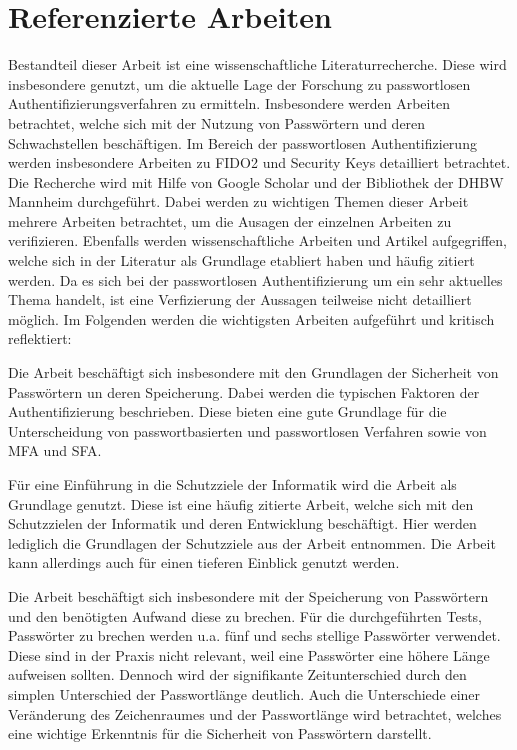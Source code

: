 \section{Referenzierte Arbeiten}

Bestandteil dieser Arbeit ist eine wissenschaftliche Literaturrecherche. Diese wird insbesondere genutzt, um die aktuelle Lage der Forschung zu passwortlosen Authentifizierungsverfahren zu ermitteln. Insbesondere werden Arbeiten betrachtet, welche sich mit der Nutzung von Passwörtern und deren Schwachstellen beschäftigen. Im Bereich der passwortlosen Authentifizierung werden insbesondere Arbeiten zu \ac{FIDO}2 und Security Keys detailliert betrachtet. Die Recherche wird mit Hilfe von Google Scholar und der Bibliothek der DHBW Mannheim durchgeführt. Dabei werden zu wichtigen Themen dieser Arbeit mehrere Arbeiten betrachtet, um die Ausagen der einzelnen Arbeiten zu verifizieren. Ebenfalls werden wissenschaftliche Arbeiten und Artikel aufgegriffen, welche sich in der Literatur als Grundlage etabliert haben und häufig zitiert werden. Da es sich bei der passwortlosen Authentifizierung um ein sehr aktuelles Thema handelt, ist eine Verfizierung der Aussagen teilweise nicht detailliert möglich. Im Folgenden werden die wichtigsten Arbeiten aufgeführt und kritisch reflektiert:

Die Arbeit \cite{boonkrong2012security} beschäftigt sich insbesondere mit den Grundlagen der Sicherheit von Passwörtern un deren Speicherung. Dabei werden die typischen Faktoren der Authentifizierung beschrieben. Diese bieten eine gute Grundlage für die Unterscheidung von passwortbasierten und passwortlosen Verfahren sowie von \ac{MFA} und \ac{SFA}. 

Für eine Einführung in die Schutzziele der Informatik wird die Arbeit \cite{samonas2014cia} als Grundlage genutzt. Diese ist eine häufig zitierte Arbeit, welche sich mit den Schutzzielen der Informatik und deren Entwicklung beschäftigt. Hier werden lediglich die Grundlagen der Schutzziele aus der Arbeit entnommen. Die Arbeit kann allerdings auch für einen tieferen Einblick genutzt werden.

Die Arbeit \cite{chanda2016password} beschäftigt sich insbesondere mit der Speicherung von Passwörtern und den benötigten Aufwand diese zu brechen. Für die durchgeführten Tests, Passwörter zu brechen werden u.a. fünf und sechs stellige Passwörter verwendet. Diese sind in der Praxis nicht relevant, weil eine Passwörter eine höhere Länge aufweisen sollten. Dennoch wird der signifikante Zeitunterschied durch den simplen Unterschied der Passwortlänge deutlich. Auch die Unterschiede einer Veränderung des Zeichenraumes und der Passwortlänge wird betrachtet, welches eine wichtige Erkenntnis für die Sicherheit von Passwörtern darstellt.

